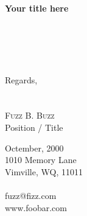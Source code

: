 \documentclass[letterpaper,12pt]{article}
\begin{document}
\begin{paracol}{2}
    \noindent\textbf{Your title here}
    \\ \\
    \lipsum[1]
    \\ \\
    \lipsum[2]
    \\ \\
    Regards,
    \\ \\ \\
    {\scshape Fuzz B. Buzz}\\
    Position / Title

    \switchcolumn
    {\footnotesize\vspace{0.03in}
     Octember, 2000
    \\
    1010 Memory Lane \\
    Vimville, WQ, 11011
    \\ \\
    fuzz@fizz.com \\
    www.foobar.com
    \\ \\
    }
\end{paracol}
\end{document}
